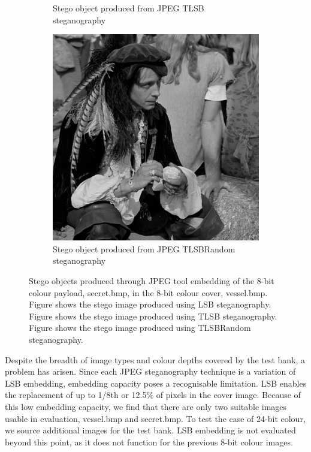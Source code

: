 \documentclass{l4proj}
\begin{document}
\begin{figure}
\begin{subfigure}[b]{0.3\textwidth}
        \caption{Stego object produced from JPEG TLSB steganography}
        \label{fig:jpeg_steg_TLSB}
    \end{subfigure}
    \begin{subfigure}[b]{0.3\textwidth}
        \includegraphics[width=\textwidth]{images/jpeg_steganography_TLSBRandom.jpeg}
        \caption{Stego object produced from JPEG TLSBRandom steganography}
        \label{fig:jpeg_steg_TLSBRandom}
    \end{subfigure}
    \caption{Stego objects produced through JPEG tool embedding of the 8-bit colour payload, secret.bmp, in the 8-bit colour cover, vessel.bmp. Figure  shows the stego image produced using LSB steganography. Figure  shows the stego image produced using TLSB steganography. Figure  shows the stego image produced using TLSBRandom steganography.}
    \label{fig:jpeg_stegos}
\end{figure}

Despite the breadth of image types and colour depths covered by the test bank, a problem has arisen. Since each JPEG steganography technique is a variation of LSB embedding, embedding capacity poses a recognisable limitation. LSB enables the replacement of up to 1/8th or 12.5\% of pixels in the cover image. Because of this low embedding capacity, we find that there are only two suitable images usable in evaluation, vessel.bmp and secret.bmp. To test the case of 24-bit colour, we source additional images for the test bank. LSB embedding is not evaluated beyond this point, as it does not function for the previous 8-bit colour images.
\end{document}
